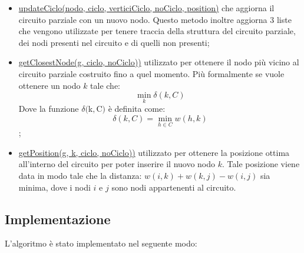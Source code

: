 \begin{itemize}
    \item \hyperlink{updateCiclo}{updateCiclo(nodo, ciclo, verticiCiclo, noCiclo, position)} che aggiorna il circuito parziale con un nuovo nodo. Questo metodo inoltre aggiorna 3 liste che vengono utilizzate per tenere traccia della struttura del circuito parziale, dei nodi presenti nel circuito e di quelli non presenti;
    \item \hyperlink{getClosestNode}{getClosestNode(g, ciclo, noCiclo))} utilizzato per ottenere il nodo più vicino al circuito parziale costruito fino a quel momento.
    Più formalmente se vuole ottenere un nodo $k$ tale che: 
    \begin{equation}
          \displaystyle  \min_{k}\delta(k, C)
    \end{equation}
    Dove la funzione $\delta($k$, $C$)$ è definita come:
    \begin{equation}
      \displaystyle \delta(k, C) = \min_{h \in C} w(h,k) 
    \end{equation};
    \item \hyperlink{getPosition}{getPosition(g, k, ciclo, noCiclo))} utilizzato per ottenere la posizione ottima all'interno del circuito per poter inserire il nuovo nodo $k$. Tale posizione viene data in modo tale che la distanza:  $w(i,k)+w(k,j)-w(i,j)$ sia minima, dove i nodi $i$ e $j$ sono nodi appartenenti al circuito.
\end{itemize}


\subsection{Implementazione}
\label{implementazione2}

L'algoritmo è stato implementato nel seguente modo:

